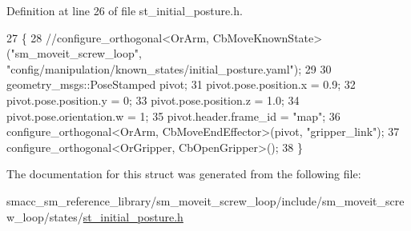 Definition at line 26 of file st\+\_\+initial\+\_\+posture.\+h.


\begin{DoxyCode}
27         \{
28             \textcolor{comment}{//configure\_orthogonal<OrArm, CbMoveKnownState>("sm\_moveit\_screw\_loop",
       "config/manipulation/known\_states/initial\_posture.yaml");}
29 
30             geometry\_msgs::PoseStamped pivot;
31             pivot.pose.position.x = 0.9;
32             pivot.pose.position.y = 0;
33             pivot.pose.position.z = 1.0;
34             pivot.pose.orientation.w = 1;
35             pivot.header.frame\_id = \textcolor{stringliteral}{"map"};
36             configure\_orthogonal<OrArm, CbMoveEndEffector>(pivot, \textcolor{stringliteral}{"gripper\_link"});
37             configure\_orthogonal<OrGripper, CbOpenGripper>();
38         \}
\end{DoxyCode}


The documentation for this struct was generated from the following file\+:\begin{DoxyCompactItemize}
\item 
smacc\+\_\+sm\+\_\+reference\+\_\+library/sm\+\_\+moveit\+\_\+screw\+\_\+loop/include/sm\+\_\+moveit\+\_\+screw\+\_\+loop/states/\hyperlink{sm__moveit__screw__loop_2include_2sm__moveit__screw__loop_2states_2st__initial__posture_8h}{st\+\_\+initial\+\_\+posture.\+h}\end{DoxyCompactItemize}

